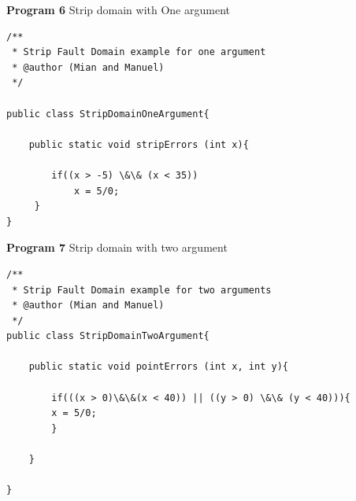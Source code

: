 \documentclass[runningheads,a4paper]{llncs}
\begin{document}
\textbf{Program 6} Strip domain with One argument
\begin{lstlisting}
/**
 * Strip Fault Domain example for one argument
 * @author (Mian and Manuel)
 */

public class StripDomainOneArgument{

	public static void stripErrors (int x){
	
		if((x > -5) \&\& (x < 35))
			x = 5/0;
  	 }
}
\end{lstlisting}
\textbf{Program 7} Strip domain with two argument
\begin{lstlisting}
/**
 * Strip Fault Domain example for two arguments
 * @author (Mian and Manuel)
 */
public class StripDomainTwoArgument{

	public static void pointErrors (int x, int y){

		if(((x > 0)\&\&(x < 40)) || ((y > 0) \&\& (y < 40))){
		x = 5/0;
		}
  	
	}

}

\end{lstlisting}
\end{document}
